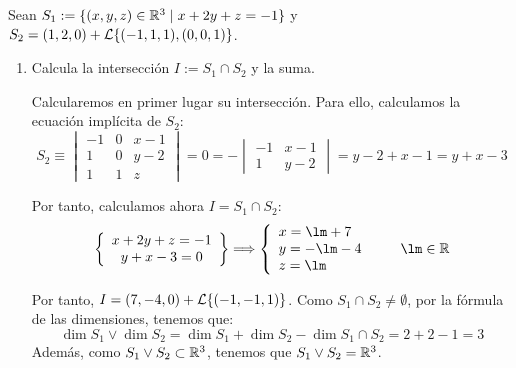 \documentclass[12pt]{article}
\begin{document}
    \begin{ejercicio}
        Sean $S_1:=\{(x,y,z)\in \mathbb{R}^3\mid x+2y+z=-1\}$ y $S_2=(1,2,0)+\mathcal{L}\{(-1,1,1), (0,0,1)\}$.
        \begin{enumerate}
            \item Calcula la intersección $I:=S_1\cap S_2$ y la suma.
            
            Calcularemos en primer lugar su intersección. Para ello, calculamos la ecuación implícita de $S_2$:
            \begin{equation*}
                S_2\equiv \begin{vmatrix}
                    -1 & 0 & x-1 \\
                    1 & 0 & y-2 \\
                    1 & 1 & z
                \end{vmatrix} = 0 = -\begin{vmatrix}
                    -1 & x-1 \\
                    1 & y-2
                \end{vmatrix} = y-2 + x-1 = y+x-3
            \end{equation*}

            Por tanto, calculamos ahora $I=S_1\cap S_2$:
            \begin{equation*}
                \left\{
                    \begin{array}{c}
                        x+2y+z=-1 \\
                        y+x-3=0
                    \end{array}
                \right\} \Longrightarrow \left\{
                    \begin{array}{l}
                        x=\lm +7\\
                        y=-\lm -4\\
                        z=\lm
                    \end{array}
                \right. \qquad \lm\in \bb{R}
            \end{equation*}

            Por tanto, $I=(7, -4, 0)+\mathcal{L}\{(-1, -1, 1)\}$. Como $S_1\cap S_2\neq \emptyset$, por la fórmula de las dimensiones, tenemos que:
            \begin{equation*}
                \dim S_1\vee \dim S_2 = \dim S_1 + \dim S_2 - \dim S_1\cap S_2 = 2+2-1=3
            \end{equation*}
            Además, como $S_1\vee S_2\subset \mathbb{R}^3$, tenemos que $S_1\vee S_2 = \mathbb{R}^3$.
            

\end{enumerate}
\end{ejercicio}
\end{document}
